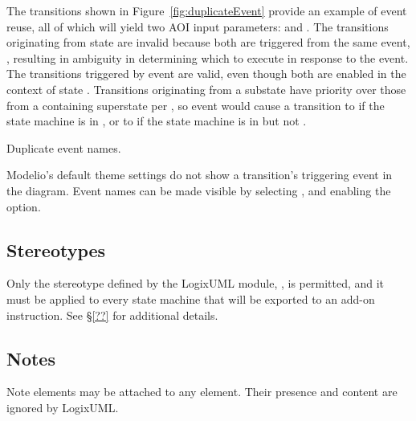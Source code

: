 The transitions shown in Figure~\ref{fig:duplicateEvent} provide an example
of event reuse, all of which will yield two AOI input parameters:
 and .
The transitions originating from state  are invalid because
both are triggered from the same event, ,
resulting in ambiguity in determining which to execute in response to the event.
The transitions triggered by event  are valid, even though both
are enabled in the context of state .
Transitions originating from a substate have priority over those
from a containing superstate per \textcite[\S14.2.3.9.4]{OMGUML}, so
event  would cause a transition to  if the
state machine is in , or to  if the state
machine is in  but not .

               {Duplicate event names.}

Modelio's default theme settings do not show a transition's triggering
event in the diagram. Event names can be made visible by selecting
, and enabling the
 option.


\subsection{Stereotypes}

Only the stereotype defined by the LogixUML module,
, is permitted, and it must be applied to
every state machine that will be exported to an add-on instruction.
See \S\ref{??} for additional details.


\subsection{Notes}

Note elements may be attached to any element. Their presence and content
are ignored by LogixUML.
